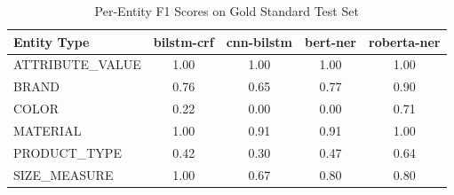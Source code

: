 
\begin{table}[htbp]
\centering
\caption{Per-Entity F1 Scores on Gold Standard Test Set}
\label{tab:gold-per-entity}
\begin{tabular}{lcccc}
\toprule
\textbf{Entity Type} & \textbf{bilstm-crf} & \textbf{cnn-bilstm} & \textbf{bert-ner} & \textbf{roberta-ner} \\
\midrule
ATTRIBUTE_VALUE & 1.00 & 1.00 & 1.00 & 1.00 \\
BRAND & 0.76 & 0.65 & 0.77 & 0.90 \\
COLOR & 0.22 & 0.00 & 0.00 & 0.71 \\
MATERIAL & 1.00 & 0.91 & 0.91 & 1.00 \\
PRODUCT_TYPE & 0.42 & 0.30 & 0.47 & 0.64 \\
SIZE_MEASURE & 1.00 & 0.67 & 0.80 & 0.80 \\
\bottomrule
\end{tabular}
\end{table}
